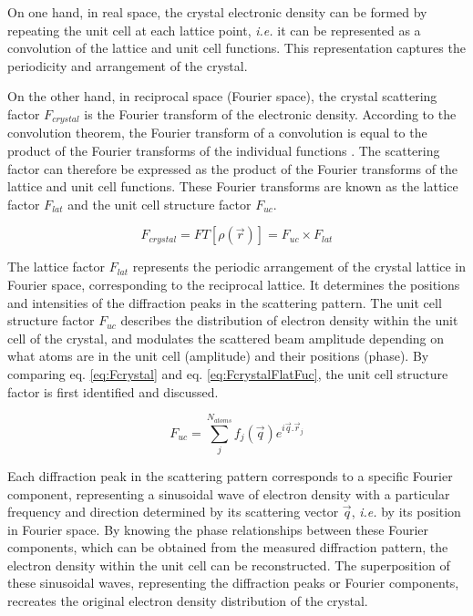 On one hand, in real space, the crystal electronic density can be formed by repeating the unit cell at each lattice point, \textit{i.e.} it can be represented as a convolution of the lattice and unit cell functions.
This representation captures the periodicity and arrangement of the crystal.

On the other hand, in reciprocal space (Fourier space), the crystal scattering factor $F_{crystal}$ is the Fourier transform of the electronic density.
According to the convolution theorem, the Fourier transform of a convolution is equal to the product of the Fourier transforms of the individual functions \parencite{Mcalister2003}.
The scattering factor can therefore be expressed as the product of the Fourier transforms of the lattice and unit cell functions.
These Fourier transforms are known as the lattice factor $F_{lat}$ and the unit cell structure factor $F_{uc}$.

\begin{equation}
    F_{crystal} = FT[\rho(\vec{r})] = F_{uc} \times F_{lat}
    \label{eq:FcrystalFlatFuc}
\end{equation}

The lattice factor $F_{lat}$ represents the periodic arrangement of the crystal lattice in Fourier space, corresponding to the reciprocal lattice.
It determines the positions and intensities of the diffraction peaks in the scattering pattern.
The unit cell structure factor $F_{uc}$ describes the distribution of electron density within the unit cell of the crystal, and modulates the scattered beam amplitude depending on what atoms are in the unit cell (amplitude) and their positions (phase).
By comparing eq. \ref{eq:Fcrystal} and eq. \ref{eq:FcrystalFlatFuc}, the unit cell structure factor is first identified and discussed.

\begin{equation}
    \label{eq:StrucFactor}
    F_{uc} = \sum_j^{N_{atoms}} f_j(\vec{q}) e^{i\vec{q}.\vec{r}_j}
\end{equation}

Each diffraction peak in the scattering pattern corresponds to a specific Fourier component, representing a sinusoidal wave of electron density with a particular frequency and direction determined by its scattering vector $\vec{q}$, \textit{i.e.} by its position in Fourier space.
By knowing the phase relationships between these Fourier components, which can be obtained from the measured diffraction pattern, the electron density within the unit cell can be reconstructed.
The superposition of these sinusoidal waves, representing the diffraction peaks or Fourier components, recreates the original electron density distribution of the crystal.

